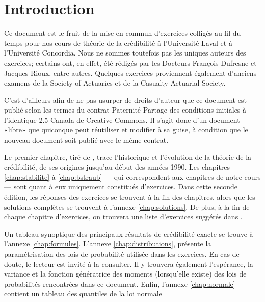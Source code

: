 
\chapter*{Introduction}

Ce document est le fruit de la mise en commun d'exercices colligés au
fil du temps pour nos cours de théorie de la crédibilité à
l'Université Laval et à l'Université Concordia. Nous ne sommes
toutefois pas les uniques auteurs des exercices; certains ont, en
effet, été rédigés par les Docteurs François Dufresne et Jacques
Rioux, entre autres. Quelques exercices proviennent également
d'anciens examens de la Society of Actuaries et de la Casualty
Actuarial Society.

C'est d'ailleurs afin de ne pas usurper de droits d'auteur que ce
document est publié selon les termes du contrat Paternité-Partage des
conditions initiales à l'identique 2.5 Canada de Creative Commons. Il
s'agit donc d'un document «libre» que quiconque peut réutiliser et
modifier à sa guise, à condition que le nouveau document soit publié
avec le même contrat.

Le premier chapitre, tiré de \cite{Goulet:masters}, trace l'historique et
l'évolution de la théorie de la crédibilité, de ses origines jusqu'au
début des années 1990. Les chapitres \ref{chap:stabilite} à
\ref{chap:bstraub} --- qui correspondent aux chapitres de notre cours
--- sont quant à eux uniquement constitués d'exercices. Dans cette
seconde édition, les réponses des exercices se trouvent à la fin des
chapitres, alors que les solutions complètes se trouvent à l'annexe
\ref{chap:solutions}. De plus, à la fin de chaque chapitre
d'exercices, on trouvera une liste d'exercices suggérés dans
\cite{Klugman:lossmodels:2e:2004,Klugman:lossmodels:3e:2008}.

Un tableau synoptique des principaux résultats de crédibilité exacte
se trouve à l'annexe \ref{chap:formules}. L'annexe
\ref{chap:distributions}, présente la paramétrisation des lois de
probabilité utilisée dans les exercices. En cas de doute, le lecteur
est invité à la consulter. Il y trouvera également l'espérance, la
variance et la fonction génératrice des moments (lorsqu'elle existe)
des lois de probabilités rencontrées dans ce document. Enfin, l'annexe
\ref{chap:normale} contient un tableau des quantiles de la loi
normale

